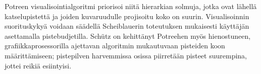 Potreen visualisointialgoritmi priorisoi niitä hierarkian solmuja, jotka ovat lähellä katselupistettä ja joiden kuvaruudulle projisoitu koko on suurin. Visualisoinnin suorituskykyä voidaan säädellä Scheiblauerin toteutuksen mukaisesti käyttäjän asettamalla pistebudjetilla. Schütz on kehittänyt Potreehen myös hienostuneen, grafiikkaprosessorilla ajettavan algoritmin mukautuvaan pisteiden koon määrittämiseen; pistepilven harvemmissa osissa piirretään pisteet suurempina, jottei reikiä esiintyisi. \cite{potree}